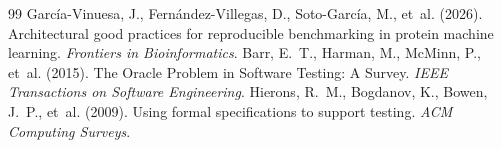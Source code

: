 \documentclass[11pt]{article}
\begin{document}
{\begin{thebibliography}{99}
 García-Vinuesa, J., Fernández-Villegas, D., Soto-García, M., et~al. (2026). Architectural good practices for reproducible benchmarking in protein machine learning. \emph{Frontiers in Bioinformatics}.
 Barr, E.~T., Harman, M., McMinn, P., et~al. (2015). The Oracle Problem in Software Testing: A Survey. \emph{IEEE Transactions on Software Engineering}.
 Hierons, R.~M., Bogdanov, K., Bowen, J.~P., et~al. (2009). Using formal specifications to support testing. \emph{ACM Computing Surveys}.
\end{thebibliography}
}
\end{document}
